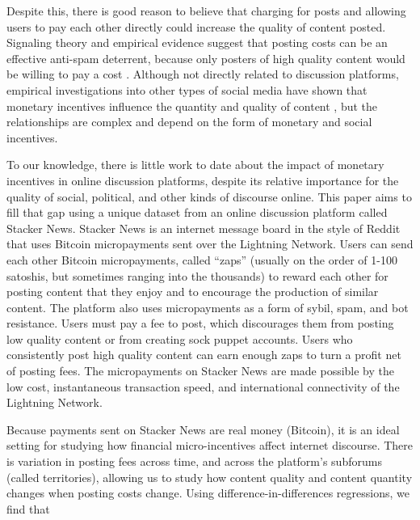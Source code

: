 Despite this, there is good reason to believe that charging for posts and allowing users to pay each other directly could increase the quality of content posted. Signaling theory and empirical evidence suggest that posting costs can be an effective anti-spam deterrent, because only posters of high quality content would be willing to pay a cost \citep{joseph2008email, tchernichovski2019pnas}. Although not directly related to discussion platforms, empirical investigations into other types of social media have shown that monetary incentives influence the quantity and quality of content \citep{chen2010google, sun2013blogs, burtch2017ms, elkomboz2023youtube, kerkhof2024youtube}, but the relationships are complex and depend on the form of monetary and social incentives.

To our knowledge, there is little work to date about the impact of monetary incentives in online discussion platforms, despite its relative importance for the quality of social, political, and other kinds of discourse online. This paper aims to fill that gap using a unique dataset from an online discussion platform called Stacker News. Stacker News is an internet message board in the style of Reddit that uses Bitcoin micropayments sent over the Lightning Network. Users can send each other Bitcoin micropayments, called ``zaps'' (usually on the order of 1-100 satoshis, but sometimes ranging into the thousands) to reward each other for posting content that they enjoy and to encourage the production of similar content. The platform also uses micropayments as a form of sybil, spam, and bot resistance. Users must pay a fee to post, which discourages them from posting low quality content or from creating sock puppet accounts. Users who consistently post high quality content can earn enough zaps to turn a profit net of posting fees. The micropayments on Stacker News are made possible by the low cost, instantaneous transaction speed, and international connectivity of the Lightning Network. 

Because payments sent on Stacker News are real money (Bitcoin), it is an ideal setting for studying how financial micro-incentives affect internet discourse. There is variation in posting fees across time, and across the platform's subforums (called territories), allowing us to study how content quality and content quantity changes when posting costs change. Using difference-in-differences regressions, we find that 